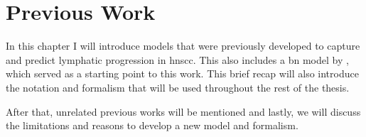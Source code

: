 \documentclass[\relativeRoot/main.tex]{subfiles}
\begin{document}
\chapter{Previous Work}
\label{chap:previous_work}

In this chapter I will introduce models that were previously developed to capture and predict lymphatic progression in \gls{hnscc}. This also includes a \gls{bn} model by \cite{pouymayou_bayesian_2019}, which served as a starting point to this work. This brief recap will also introduce the notation and formalism that will be used throughout the rest of the thesis.

After that, unrelated previous works will be mentioned and lastly, we will discuss the limitations and reasons to develop a new model and formalism.




\end{document}
